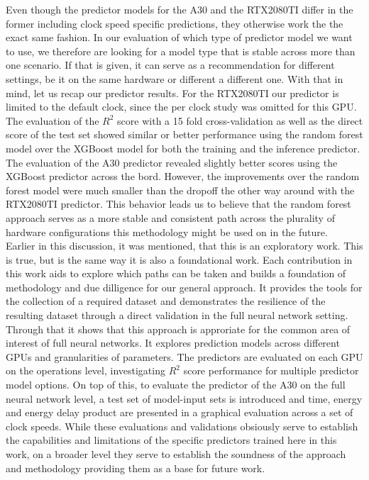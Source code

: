 Even though the predictor models for the A30 and the RTX2080TI differ in the former including clock speed specific predictions, they otherwise work the the exact same fashion. In our evaluation of which type of predictor model we want to use, we therefore are looking for a model type that is stable across more than one scenario. If that is given, it can serve as a recommendation for different settings, be it on the same hardware or different a different one. With that in mind, let us recap our predictor results. For the RTX2080TI our predictor is limited to the default clock, since the per clock study was omitted for this GPU. The evaluation of the $R^2$ score with a 15 fold cross-validation as well as the direct score of the test set showed similar or better performance using the random forest model over the XGBoost model for both the training and the inference predictor. The evaluation of the A30 predictor revealed slightly better scores using the XGBoost predictor across the bord. However, the improvements over the random forest model were much smaller than the dropoff the other way around with the RTX2080TI predictor. This behavior leads us to believe that the random forest approach serves as a more stable and consistent path across the plurality of hardware configurations this methodology might be used on in the future. \\
Earlier in this discussion, it was mentioned, that this is an exploratory work. This is true, but is the same way it is also a foundational work. Each contribution in this work aids to explore which paths can be taken and builds a foundation of methodology and due dilligence for our general approach. It provides the tools for the collection of a required dataset and demonstrates the resilience of the resulting dataset through a direct validation in the full neural network setting. Through that it shows that this approach is approriate for the common area of interest of full neural networks. It explores prediction models across different GPUs and granularities of parameters. The predictors are evaluated on each GPU on the operations level, investigating $R^2$ score performance for multiple predictor model options. On top of this, to evaluate the predictor of the A30 on the full neural network level, a test set of model-input sets is introduced and time, energy and energy delay product are presented in a graphical evaluation across a set of clock speeds. While these evaluations and validations obsiously serve to establish the capabilities and limitations of the specific predictors trained here in this work, on a broader level they serve to establish the soundness of the approach and methodology providing them as a base for future work.

